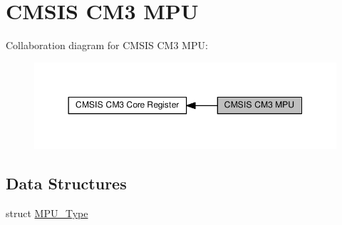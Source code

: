 \hypertarget{group__CMSIS__CM3__MPU}{}\section{C\+M\+S\+IS C\+M3 M\+PU}
\label{group__CMSIS__CM3__MPU}
Collaboration diagram for C\+M\+S\+IS C\+M3 M\+PU\+:\nopagebreak
\begin{figure}[H]
\begin{center}
\leavevmode
\includegraphics[width=350pt]{da/d63/group__CMSIS__CM3__MPU}
\end{center}
\end{figure}
\subsection*{Data Structures}
\begin{DoxyCompactItemize}
\item 
struct \hyperlink{structMPU__Type}{M\+P\+U\+\_\+\+Type}
\end{DoxyCompactItemize}

